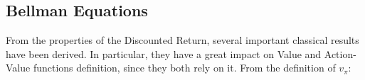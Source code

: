         \subsection{Bellman Equations}
            \label{subs:bellman}
            
            
            From the properties of the Discounted Return, several important classical results have been derived. In particular, they have a great impact on Value and Action-Value functions definition, since they both rely on it. From the definition of $v_{\pi}$:
            

